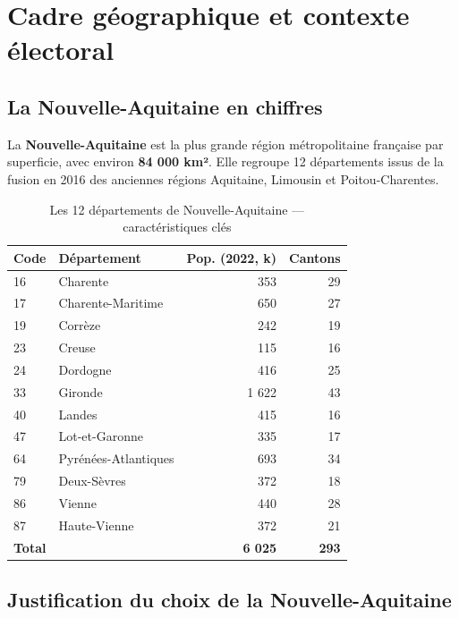 \chapter{Cadre géographique et contexte électoral}
\label{ch:geo}

\section{La Nouvelle-Aquitaine en chiffres}

La \textbf{Nouvelle-Aquitaine} est la plus grande région métropolitaine française par
superficie, avec environ \textbf{84 000 km²}. Elle regroupe 12 départements issus de la
fusion en 2016 des anciennes régions Aquitaine, Limousin et Poitou-Charentes.

\begin{table}[H]
\centering
\caption{Les 12 départements de Nouvelle-Aquitaine — caractéristiques clés}
\label{tab:departements}
\begin{tabular}{llrr}
\toprule
\textbf{Code} & \textbf{Département} & \textbf{Pop. (2022, k)} & \textbf{Cantons} \\
\midrule
16 & Charente           & 353  & 29 \\
17 & Charente-Maritime  & 650  & 27 \\
19 & Corrèze            & 242  & 19 \\
23 & Creuse             & 115  & 16 \\
24 & Dordogne           & 416  & 25 \\
33 & Gironde            & 1 622 & 43 \\
40 & Landes             & 415  & 16 \\
47 & Lot-et-Garonne     & 335  & 17 \\
64 & Pyrénées-Atlantiques & 693 & 34 \\
79 & Deux-Sèvres        & 372  & 18 \\
86 & Vienne             & 440  & 28 \\
87 & Haute-Vienne       & 372  & 21 \\
\midrule
\multicolumn{2}{l}{\textbf{Total}} & \textbf{6 025} & \textbf{293} \\
\bottomrule
\end{tabular}
\end{table}

\section{Justification du choix de la Nouvelle-Aquitaine}

